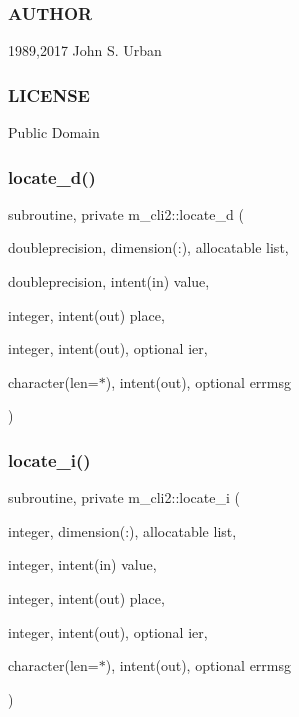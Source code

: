\subsubsection*{A\+U\+T\+H\+OR}

1989,2017 John S. Urban \subsubsection*{L\+I\+C\+E\+N\+SE}

Public Domain \mbox{\label{namespacem__cli2_a0e859cd8635ab617ea9a4e9b4ffca852}} 
\subsubsection{\texorpdfstring{locate\+\_\+d()}{locate\_d()}}
{\footnotesize\ttfamily subroutine, private m\+\_\+cli2\+::locate\+\_\+d (\begin{DoxyParamCaption}\item[{doubleprecision, dimension(\+:), allocatable}]{list,  }\item[{doubleprecision, intent(in)}]{value,  }\item[{integer, intent(out)}]{place,  }\item[{integer, intent(out), optional}]{ier,  }\item[{character(len=$\ast$), intent(out), optional}]{errmsg }\end{DoxyParamCaption})\hspace{0.3cm}{\ttfamily [private]}}

\mbox{\label{namespacem__cli2_a3cc41a1a629f9ab278376a71b243673d}} 
\subsubsection{\texorpdfstring{locate\+\_\+i()}{locate\_i()}}
{\footnotesize\ttfamily subroutine, private m\+\_\+cli2\+::locate\+\_\+i (\begin{DoxyParamCaption}\item[{integer, dimension(\+:), allocatable}]{list,  }\item[{integer, intent(in)}]{value,  }\item[{integer, intent(out)}]{place,  }\item[{integer, intent(out), optional}]{ier,  }\item[{character(len=$\ast$), intent(out), optional}]{errmsg }\end{DoxyParamCaption})\hspace{0.3cm}{\ttfamily [private]}}

